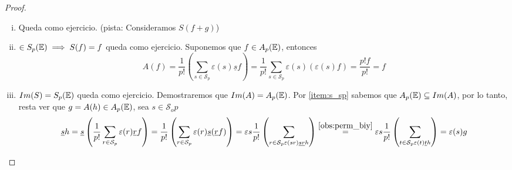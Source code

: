 \begin{proof}
    \begin{enumerate}[i)]
        \item Queda como ejercicio. (pista: Consideramos $S(f+g)$)
        \item $ \in S_p(\mathbb{E}) \implies S(f) = f$ queda como ejercicio.
        Suponemos que $f \in A_p(\mathbb{E})$, entonces
        \[
            A(f) = \frac{1}{p!} \left(\sum_{s \in \mathcal{S}_p} \varepsilon(s)\underline{s}f \right)
            = \frac{1}{p!}\sum_{s \in \mathcal{S}_p} \varepsilon(s) \left( \varepsilon(s)f \right) =
            \frac{p!f}{p!} = f
        \]
        \item $Im(S)=S_p(\mathbb{E})$ queda como ejercicio. Demostraremos que $Im(A)=A_p(\mathbb{E})$.
        Por \ref{item:s_sp} sabemos que $A_p(\mathbb{E}) \subseteq Im(A)$, por lo tanto, resta
        ver que $g=A(h)\in A_p(\mathbb{E})$, sea $s \in \mathcal{S}_op$
        \[
            \underline{s}h = \underline{s}\left( \frac{1}{p!}\sum_{r \in \mathcal{S}_p} \varepsilon(r)\underline{r}f
            \right) = \frac{1}{p!}\left(\sum_{r \in \mathcal{S}_p} \varepsilon(r)\underline{s}(\underline{r}f)\right) = 
            \varepsilon{s}\frac{1}{p!} \left( \sum_{r \in \mathcal{S}_p \varepsilon(sr) \underline{sr}h} \right) \stackrel{\ref{obs:perm_biy}}{=}
            \varepsilon{s}\frac{1}{p!} \left( \sum_{t \in \mathcal{S}_p \varepsilon(t) \underline{t}h} \right) = \varepsilon(s)g
        \]
    \end{enumerate}
\end{proof}
